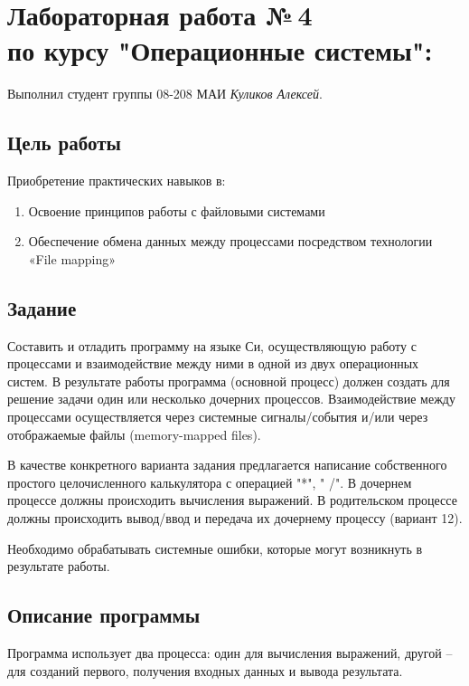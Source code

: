 \documentclass[12pt]{article}
\begin{document}
\section*{Лабораторная работа №\,4 \\ по курсу "Операционные системы": }

Выполнил студент группы 08-208 МАИ \textit{Куликов Алексей}.

\subsection*{Цель работы}
Приобретение практических навыков в:
 
\begin{enumerate}
\item  Освоение принципов работы с файловыми системами
\item  Обеспечение обмена данных между процессами посредством технологии «File mapping»
\end{enumerate}

\subsection*{Задание}

Составить и отладить программу на языке Си, осуществляющую работу с процессами и взаимодействие между ними в одной из двух операционных систем. В результате работы программа (основной процесс) должен создать для решение задачи один или несколько дочерних процессов. Взаимодействие между процессами осуществляется через системные сигналы/события и/или через отображаемые файлы (memory-mapped files).

В качестве конкретного варианта задания предлагается написание собственного простого целочисленного калькулятора с операцией  "*", " /". В дочернем процессе должны происходить вычисления выражений. В родительском процессе должны происходить вывод/ввод и передача их дочернему процессу (вариант 12).

Необходимо обрабатывать системные ошибки, которые могут возникнуть в результате работы.

\subsection*{Описание программы}

Программа использует два процесса: один для вычисления выражений, другой -- для созданий первого, получения входных данных и вывода результата.
\end{document}

